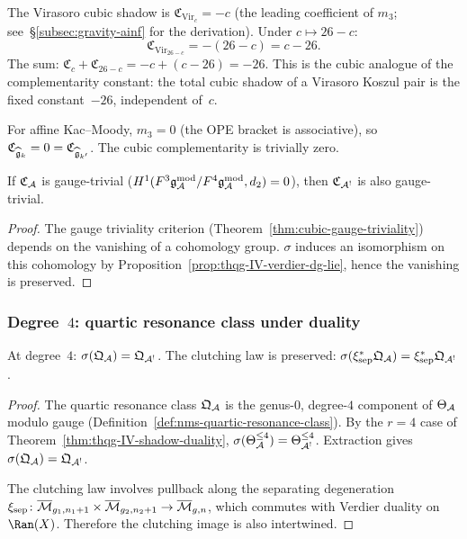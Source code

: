 \begin{computation}
The Virasoro cubic shadow is $\mathfrak{C}_{\mathrm{Vir}_c} = -c$
(the leading coefficient of $m_3$;
see~\S\ref{subsec:gravity-ainf} for the derivation).
Under $c \mapsto 26 - c$:
\[
\mathfrak{C}_{\mathrm{Vir}_{26-c}} = -(26 - c) = c - 26.
\]
The sum: $\mathfrak{C}_c + \mathfrak{C}_{26-c} = -c + (c - 26) = -26$.
This is the cubic analogue of the complementarity constant: the total
cubic shadow of a Virasoro Koszul pair is the fixed constant~$-26$,
independent of~$c$.

For affine Kac--Moody, $m_3 = 0$ (the OPE bracket is associative),
so $\mathfrak{C}_{\widehat{\mathfrak{g}}_k} = 0 = \mathfrak{C}_{\widehat{\mathfrak{g}}_{k'}}$.
The cubic complementarity is trivially zero.
\end{computation}

\begin{corollary}
If $\mathfrak{C}_{\mathcal{A}}$ is gauge-trivial
\textup{(}$H^1(F^3\mathfrak{g}_{\mathcal{A}}^{\mathrm{mod}}/F^4\mathfrak{g}_{\mathcal{A}}^{\mathrm{mod}}, d_2) = 0$\textup{)},
then $\mathfrak{C}_{\mathcal{A}^!}$ is also gauge-trivial.
\end{corollary}

\begin{proof}
The gauge triviality criterion
(Theorem~\ref{thm:cubic-gauge-triviality})
depends on the vanishing of a cohomology group.
$\sigma$ induces an isomorphism on this cohomology by
Proposition~\ref{prop:thqg-IV-verdier-dg-lie}, hence the vanishing
is preserved.
\end{proof}

\subsubsection{Degree~$4$: quartic resonance class under duality}

\begin{proposition}
At degree~$4$:
$\sigma(\mathfrak{Q}_{\mathcal{A}}) = \mathfrak{Q}_{\mathcal{A}^!}$.
The clutching law is preserved:
$\sigma(\xi^*_{\mathrm{sep}}\mathfrak{Q}_{\mathcal{A}})
= \xi^*_{\mathrm{sep}}\mathfrak{Q}_{\mathcal{A}^!}$.
\end{proposition}

\begin{proof}
The quartic resonance class $\mathfrak{Q}_{\mathcal{A}}$ is the genus-$0$,
degree-$4$ component of $\Theta_{\mathcal{A}}$ modulo gauge
(Definition~\ref{def:nms-quartic-resonance-class}). By the $r = 4$
case of Theorem~\ref{thm:thqg-IV-shadow-duality},
$\sigma(\Theta_{\mathcal{A}}^{\leq 4}) = \Theta_{\mathcal{A}^!}^{\leq 4}$.
Extraction gives $\sigma(\mathfrak{Q}_{\mathcal{A}}) = \mathfrak{Q}_{\mathcal{A}^!}$.

The clutching law involves pullback along the separating degeneration
$\xi_{\mathrm{sep}}\colon
\overline{\mathcal{M}}_{g_1,n_1+1} \times \overline{\mathcal{M}}_{g_2,n_2+1}
\to \overline{\mathcal{M}}_{g,n}$, which commutes with Verdier duality
on $\Ran(X)$. Therefore the clutching image is also intertwined.
\end{proof}


